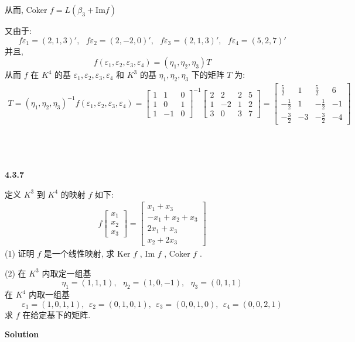 \documentclass[11pt,a4paper,openany,oneside]{book}
\newcommand\Solution{\noindent\textbf{\textsf{Solution}}\par\medskip}
\begin{document}
从而, Coker $ f = L(\beta_3 +  \mathrm{Im} f)  $ 

又由于:
 $$  f\varepsilon_1 = (2, 1, 3)', \ \ \ f\varepsilon_2=(2, -2, 0)', \ \ \ f\varepsilon_3=(2,1,3)', \ \ \ f\varepsilon_4=(5,2,7)'  $$ 
并且, 
 $$  f(\varepsilon_1, \varepsilon_2, \varepsilon_3, \varepsilon_4)= (\eta_1, \eta_2, \eta_3)T  $$  
从而 $ f $ 在 $ K^4 $ 的基 $ \varepsilon_1, \varepsilon_2, \varepsilon_3, \varepsilon_4 $ 和 $ K^3 $ 的基 $ \eta_1, \eta_2, \eta_3 $ 下的矩阵 $ T $ 为:
\begin{gather*}
T =(\eta_1, \eta_2, \eta_3)^{-1}f(\varepsilon_1, \varepsilon_2, \varepsilon_3, \varepsilon_4) =
\begin{bmatrix}
1  &  1  &  0  \\
1  &  0  &  1 \\
1  &  -1  &  0
\end{bmatrix}^{-1}
\begin{bmatrix}
2  &  2  &  2  & 5 \\
1  &  -2  &  1 &  2 \\
3  &  0  &  3  &  7
\end{bmatrix}
= 
\begin{bmatrix}
\frac{5}{2}  &   1   &   \frac{5}{2}   &  6 \\
-\frac{1}{2} &   1   &   -\frac{1}{2}  &  -1 \\
-\frac{3}{2} &  -3   &  -\frac{3}{2}   &  -4
\end{bmatrix}
\end{gather*}  \\  \\  \\




\begin{myexample}
	\textbf{4.3.7}

定义 $ K^3 $ 到 $ K^4 $ 的映射 $ f $ 如下:
\begin{gather*}
f
\begin{bmatrix}
x_1 \\ x_2 \\ x_3
\end{bmatrix}
=
\begin{bmatrix}
x_1+x_3 \\
-x_1 + x_2 + x_3 \\
2x_1 + x_3 \\
x_2 + 2x_3
\end{bmatrix}
\end{gather*}
(1) 证明 $ f $ 是一个线性映射, 求 $\mathrm{Ker}$  $ f $ , Im $ f $ , Coker $ f $ .

(2) 在 $ K^3 $ 内取定一组基
 $$  \eta_1 = (1,1,1),  \ \ \ \eta_2=(1,0,-1), \ \ \ \eta_3=(0,1,1)  $$ 
在 $ K^4 $ 内取一组基
 $$  \varepsilon_1=(1,0,1,1), \ \ \varepsilon_2=(0,1,0,1), \ \ \varepsilon_3=(0,0,1,0), \ \ \varepsilon_4=(0,0,2,1)  $$ 
求 $ f $ 在给定基下的矩阵.  
\end{myexample}
\Solution  
\end{document}
